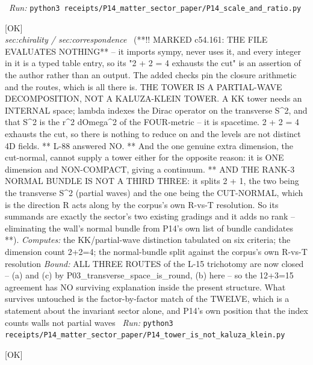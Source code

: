 \begin{description}
\ \emph{Run:} \texttt{python3 receipts/P14\_matter\_sector\_paper/P14\_scale\_and\_ratio.py}
\item[\label{rcpt:P14_tower_is_not_kaluza_klein}\texttt{P14\_tower\_is\_not\_kaluza\_klein}]\hfill\textsf{[OK]}\\
\textit{sec:chirality / sec:correspondence} \ (**!! MARKED c54.161: THE FILE EVALUATES NOTHING** -- it imports sympy, never uses it, and every integer in it is a typed table entry, so its "2 + 2 = 4 exhausts the cut" is an assertion of the author rather than an output. The added checks pin the closure arithmetic and the routes, which is all there is. THE TOWER IS A PARTIAL-WAVE DECOMPOSITION, NOT A KALUZA-KLEIN TOWER. A KK tower needs an INTERNAL space; lambda indexes the Dirac operator on the transverse S\textasciicircum{}2, and that S\textasciicircum{}2 is the r\textasciicircum{}2 dOmega\textasciicircum{}2 of the FOUR-metric -- it is spacetime. 2 + 2 = 4 exhausts the cut, so there is nothing to reduce on and the levels are not distinct 4D fields. ** L-88 answered NO. ** And the one genuine extra dimension, the cut-normal, cannot supply a tower either for the opposite reason: it is ONE dimension and NON-COMPACT, giving a continuum. ** AND THE RANK-3 NORMAL BUNDLE IS NOT A THIRD THREE: it splits 2 + 1, the two being the transverse S\textasciicircum{}2 (partial waves) and the one being the CUT-NORMAL, which is the direction R acts along by the corpus's own R-vs-T resolution. So its summands are exactly the sector's two existing gradings and it adds no rank -- eliminating the wall's normal bundle from P14's own list of bundle candidates **). 
\emph{Computes:} the KK/partial-wave distinction tabulated on six criteria; the dimension count 2+2=4; the normal-bundle split against the corpus's own R-vs-T resolution
 \emph{Bound:} ALL THREE ROUTES of the L-15 trichotomy are now closed -- (a) and (c) by P03\_transverse\_space\_is\_round, (b) here -- so the 12+3=15 agreement has NO surviving explanation inside the present structure. What survives untouched is the factor-by-factor match of the TWELVE, which is a statement about the invariant sector alone, and P14's own position that the index counts walls not partial waves
\ \emph{Run:} \texttt{python3 receipts/P14\_matter\_sector\_paper/P14\_tower\_is\_not\_kaluza\_klein.py}
\item[\label{rcpt:P03_the_turnaround_figure}\texttt{P03\_the\_turnaround\_figure}]\hfill\textsf{[OK]}\\

\end{description}
